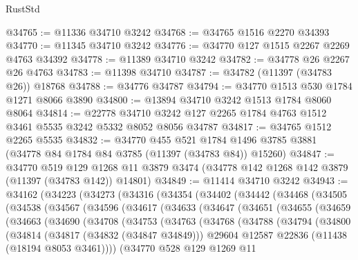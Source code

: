 \begin{lexlean}{RustStd}
\begin{coremodule}
@34765 := @11336 @34710 @3242
@34768 := @34765 @1516 @2270 @34393
@34770 := @11345 @34710 @3242
@34776 := @34770 @127 @1515 @2267 @2269 @4763 @34392
@34778 := @11389 @34710 @3242
@34782 := @34778 @26 @2267 @26 @4763
@34783 := @11398 @34710
@34787 := @34782 (@11397 (@34783 @26)) @18768
@34788 := @34776 @34787
@34794 := @34770 @1513 @530 @1784 @1271 @8066 @3890
@34800 := @13894 @34710 @3242 @1513 @1784 @8060 @8064
@34814 := @22778
    @34710
    @3242
    @127
    @2265
    @1784
    @4763
    @1512
    @3461
    @5535
    @3242
    @5332
    @8052
    @8056
    @34787
@34817 := @34765 @1512 @2265 @5535
@34832 := @34770
    @455
    @521
    @1784
    @1496
    @3785
    @3881
    (@34778 @84 @1784 @84 @3785 (@11397 (@34783 @84)) @15260)
@34847 := @34770
    @519
    @129
    @1268
    @11
    @3879
    @3474
    (@34778 @142 @1268 @142 @3879 (@11397 (@34783 @142)) @14801)
@34849 := @11414 @34710 @3242
@34943 := @34162
    (@34223
      (@34273
        (@34316
          (@34354
            (@34402
              (@34442
                (@34468
                  (@34505
                    (@34538
                      (@34567
                        (@34596
                          (@34617
                            (@34633
                              (@34647
                                (@34651
                                  (@34655
                                    (@34659
                                      (@34663
                                        (@34690
                                          (@34708
                                            (@34753
                                              (@34763
                                                (@34768
                                                  (@34788
                                                    (@34794
                                                      (@34800
                                                        (@34814
                                                          (@34817 (@34832 (@34847 @34849)))
                                                          @29604
                                                          @12587
                                                          @22836
                                                          (@11438 (@18194 @8053 @3461))))
                                                      (@34770
                                                        @528
                                                        @129
                                                        @1269
                                                        @11

\end{coremodule}
\end{lexlean}
